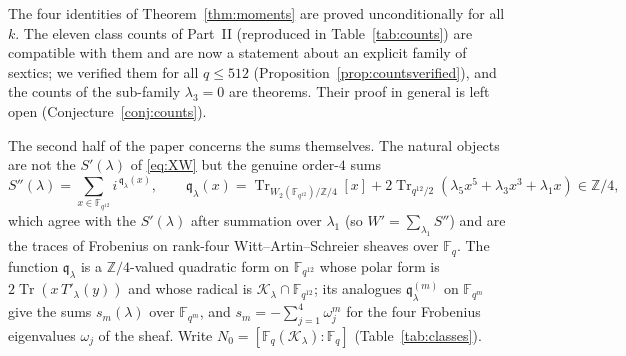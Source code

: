\documentclass[12pt,a4paper]{amsart}
\theoremstyle{definition}
\newcommand{\F}{\mathbb{F}}
\newcommand{\Z}{\mathbb{Z}}
\newcommand{\Tr}{\operatorname{Tr}}
\newcommand{\Kk}{\mathcal{K}}
\newcommand{\qq}{\mathfrak{q}}
\newcommand{\Spp}{S''}
\begin{document}
The four identities of Theorem~\ref{thm:moments} are proved unconditionally for all $k$. The eleven class counts of Part~II (reproduced in Table~\ref{tab:counts}) are compatible with them and are now a statement about an explicit family of sextics; we verified them for all $q\le512$ (Proposition~\ref{prop:countsverified}), and the counts of the sub-family $\lambda_3=0$ are theorems. Their proof in general is left open (Conjecture~\ref{conj:counts}).

The second half of the paper concerns the sums themselves. The natural objects are not the $S'(\lambda)$ of \eqref{eq:XW} but the genuine order-$4$ sums
\begin{equation}\label{eq:Spp}
\Spp(\lambda)=\sum_{x\in\F_{q^{12}}}i^{\,\qq_\lambda(x)},\qquad \qq_\lambda(x)=\Tr_{W_2(\F_{q^{12}})/\Z/4}[x]+2\Tr_{q^{12}/2}(\lambda_5x^5+\lambda_3x^3+\lambda_1x)\in\Z/4,
\end{equation}
which agree with the $S'(\lambda)$ after summation over $\lambda_1$ (so $W'=\sum_{\lambda_1}\Spp$) and are the traces of Frobenius on rank-four Witt--Artin--Schreier sheaves over $\F_q$. The function $\qq_\lambda$ is a $\Z/4$-valued quadratic form on $\F_{q^{12}}$ whose polar form is $2\Tr(x\,T'_\lambda(y))$ and whose radical is $\Kk_\lambda\cap\F_{q^{12}}$; its analogues $\qq^{(m)}_\lambda$ on $\F_{q^m}$ give the sums $s_m(\lambda)$ over $\F_{q^m}$, and $s_m=-\sum_{j=1}^4\omega_j^m$ for the four Frobenius eigenvalues $\omega_j$ of the sheaf. Write $N_0=[\F_q(\Kk_\lambda):\F_q]$ (Table~\ref{tab:classes}).
\end{document}
